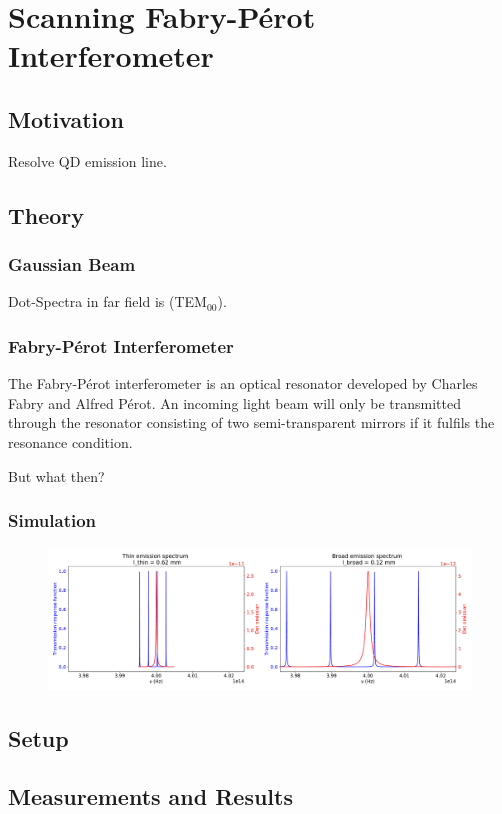 \chapter{Scanning Fabry-Pérot Interferometer}

\section{Motivation}

Resolve QD emission line.

\section{Theory}

\subsection{Gaussian Beam}

Dot-Spectra in far field is (TEM$_{00}$).

\subsection{Fabry-Pérot Interferometer}

The Fabry-Pérot interferometer is an optical resonator developed by Charles Fabry and Alfred Pérot.
An incoming light beam will only be transmitted through the resonator consisting of two semi-transparent mirrors if it fulfils the resonance condition.\cite{kaldewey_coherent_2017}

But what then?

\subsection{Simulation}

\begin{figure}[H]
	\centering
	\includegraphics[width=1\linewidth]{figures/plots/fabry-perot/simulation-comparison-dot-fabry-perot-modes}
	\caption{}
	\label{fig:simulation-comparison-dot-fabry-perot-modes}
\end{figure}

\Blindtext

\section{Setup}

\section{Measurements and Results}